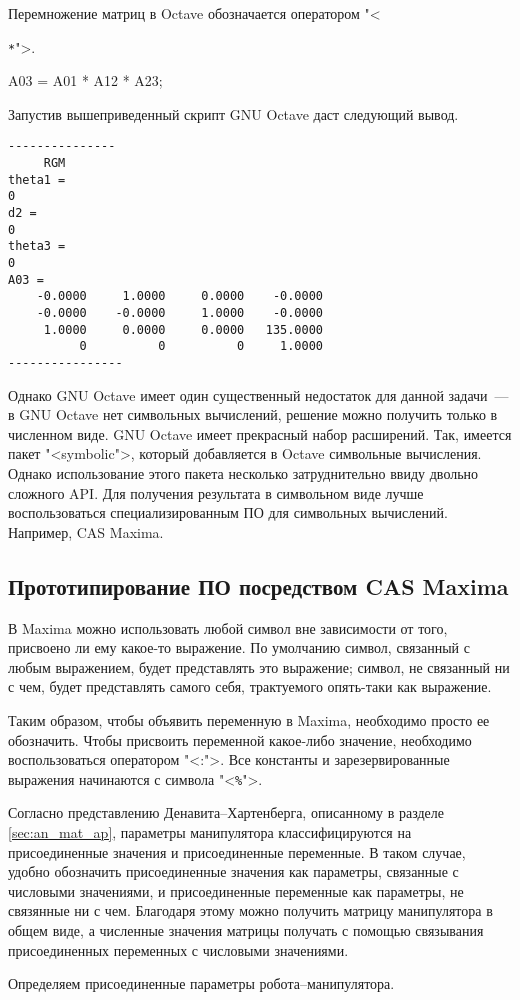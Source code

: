 \documentclass[oneside, final, 14pt]{extarticle}
\begin{document}
Перемножение матриц в Octave обозначается оператором "<{\verb|*|">.

{\small \begin{listing}{35}
A03 = A01 * A12 * A23;
\end{listing} 
}
\par

Запустив вышеприведенный скрипт GNU Octave даст следующий вывод.

\begin{minipage}{1\textwidth}
{\small
\begin{verbatim}
---------------
     RGM
theta1 =
0
d2 =
0
theta3 =
0
A03 =
    -0.0000     1.0000     0.0000    -0.0000
    -0.0000    -0.0000     1.0000    -0.0000
     1.0000     0.0000     0.0000   135.0000
          0          0          0     1.0000
----------------
\end{verbatim} 
}
\end{minipage}
\par

Однако GNU Octave имеет один существенный недостаток для данной задачи~--- в GNU Octave нет символьных вычислений, решение можно получить только в численном виде.
GNU Octave имеет прекрасный набор расширений.
Так, имеется пакет "<{\ttfamily symbolic}">, который добавляется в Octave символьные вычисления.
Однако использование этого пакета несколько затруднительно ввиду двольно сложного API.
Для получения результата в символьном виде лучше воспользоваться специализированным ПО для символьных вычислений.
Например, CAS Maxima.

\subsection{Прототипирование ПО посредством CAS Maxima}
\label{s:prot_maxima}

В Maxima можно использовать любой символ вне зависимости от того, присвоено ли ему какое-то выражение.
По умолчанию символ, связанный с любым выражением, будет представлять это выражение; символ, не связанный ни с чем, будет представлять самого себя, трактуемого опять-таки как выражение.
\par
Таким образом, чтобы объявить переменную в Maxima, необходимо просто ее обозначить.
Чтобы присвоить переменной какое-либо значение, необходимо воспользоваться оператором "<{\ttfamily :}">.
Все константы и зарезервированные выражения начинаются с символа "<{\ttfamily \verb|%|}">.
\par
Согласно представлению Денавита--Хартенберга, описанному в разделе \ref{sec:an_mat_ap}, параметры манипулятора классифицируются на присоединенные значения и присоединенные переменные.
В таком случае, удобно обозначить присоединенные значения как параметры, связанные с числовыми значениями, и присоединенные переменные как параметры, не связянные ни с чем.
Благодаря этому можно получить матрицу манипулятора в общем виде, а численные значения матрицы получать с помощью связывания присоединенных переменных с числовыми значениями.
\par
Определяем присоединенные параметры робота--манипулятора.

}
\end{document}
